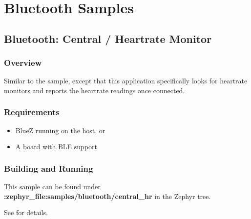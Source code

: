 \documentclass[letterpaper,10pt,english]{sphinxmanual}
\begin{document}
\section{Bluetooth Samples}
\label{\detokenize{samples/bluetooth/bluetooth:bluetooth-samples}}\label{\detokenize{samples/bluetooth/bluetooth:id1}}\label{\detokenize{samples/bluetooth/bluetooth::doc}}

\subsection{Bluetooth: Central / Heart\sphinxhyphen{}rate Monitor}
\label{\detokenize{samples/bluetooth/central_hr/README:bluetooth-central-heart-rate-monitor}}\label{\detokenize{samples/bluetooth/central_hr/README:bluetooth-central-hr}}\label{\detokenize{samples/bluetooth/central_hr/README::doc}}

\subsubsection{Overview}
\label{\detokenize{samples/bluetooth/central_hr/README:overview}}
Similar to the  sample, except that this
application specifically looks for heart\sphinxhyphen{}rate monitors and reports the
heart\sphinxhyphen{}rate readings once connected.


\subsubsection{Requirements}
\label{\detokenize{samples/bluetooth/central_hr/README:requirements}}\begin{itemize}
\item {} 
BlueZ running on the host, or

\item {} 
A board with BLE support

\end{itemize}


\subsubsection{Building and Running}
\label{\detokenize{samples/bluetooth/central_hr/README:building-and-running}}
This sample can be found under {\color{red}\bfseries{}:zephyr\_file:\textasciigrave{}samples/bluetooth/central\_hr\textasciigrave{}} in the
Zephyr tree.

See {\hyperref[\detokenize{samples/bluetooth/bluetooth:bluetooth-samples}]{}} for details.
\end{document}

